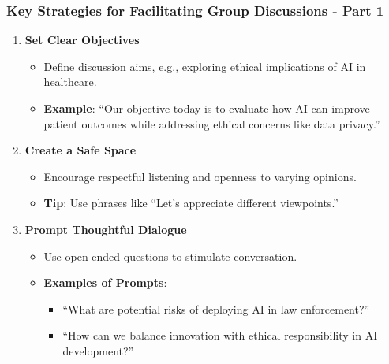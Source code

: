 \documentclass{beamer}
\begin{document}
\begin{frame}[fragile]
    \frametitle{Key Strategies for Facilitating Group Discussions - Part 1}
    \begin{enumerate}
        \item \textbf{Set Clear Objectives}
        \begin{itemize}
            \item Define discussion aims, e.g., exploring ethical implications of AI in healthcare.
            \item \textbf{Example}: “Our objective today is to evaluate how AI can improve patient outcomes while addressing ethical concerns like data privacy.”
        \end{itemize}

        \item \textbf{Create a Safe Space}
        \begin{itemize}
            \item Encourage respectful listening and openness to varying opinions.
            \item \textbf{Tip}: Use phrases like “Let’s appreciate different viewpoints.”
        \end{itemize}

        \item \textbf{Prompt Thoughtful Dialogue}
        \begin{itemize}
            \item Use open-ended questions to stimulate conversation.
            \item \textbf{Examples of Prompts}:
            \begin{itemize}
                \item “What are potential risks of deploying AI in law enforcement?”
                \item “How can we balance innovation with ethical responsibility in AI development?”
            \end{itemize}
        \end{itemize}
    \end{enumerate}
\end{frame}
\end{document}
